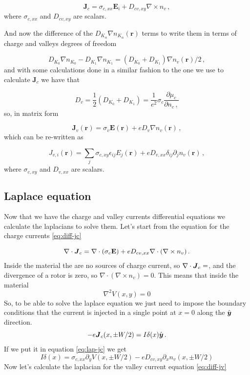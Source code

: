 \begin{equation}
    \mathbf J_{c}= \sigma_{c,xx}\mathbf E_i + D_{cv,xy} \nabla \times n_v\,,
    \label{eq:diff-jc}
\end{equation}
where $\sigma_{c,xx}$ and $D_{cv,xy}$ are scalars.

And now the difference of the $D_{K_\alpha}\nabla n_{K_\alpha}(\mathbf r)$ terms to write them in terms of charge and valleys degrees of freedom

\[D_{K_0}\nabla n_{K_0}-D_{K_1}\nabla n_{K_1}=(D_{K_0}+D_{K_1})\nabla n_v(\mathbf r)/2\,,\]
and with some calculations done in a similar fashion to the one we use to calculate $\mathbf J_c$ we have that

\[D_v=\frac12(D_{K_0}+D_{K_1})=\frac 1{e^2}\sigma_c\frac{\partial \mu_c}{\partial n_c\,,}\]
so, in matrix form


\begin{equation}
    \mathbf J_v(\mathbf r)=\sigma_v\mathbf E(\mathbf r)+eD_{v}\nabla n_v(\mathbf r) \,,   
\end{equation}
which can be re-written as


\begin{equation}
    J_{v,i}(\mathbf r)=\sum_j \sigma_{c,xy} \epsilon_{ij}  E_j(\mathbf r)+eD_{v,xx}\delta_{ij}\partial_j n_v(\mathbf r)
    \,,
    \label{eq:diff-jv}  
\end{equation}
where $\sigma_{c,xy}$ and $D_{v,xx}$ are scalars.


\subsection{Laplace equation}

Now that we have the charge and valley currents differential equations we calculate the laplacians to solve them. Let's start from the equation for the charge currents \ref{eq:diff-jc}

\begin{equation}
    \nabla \cdot \boldsymbol{J}_c=\nabla \cdot (\sigma_c \mathbf E)+ eD_{cv,xx}\nabla \cdot (\nabla\times n_v)\,.
    \label{eq:lap-jc}
\end{equation}
Inside the material the are no sources of charge current, so $\nabla \cdot \boldsymbol{J}_c=$, and the divergence of a rotor is zero, so $\nabla \cdot (\nabla\times n_v)=0$. This means that inside the material
\begin{equation}
    \boxed{
    \nabla^2 V(x,y)=0
    }
\end{equation}
So, to be able to solve the laplace equation we just need to impose the boundary conditions that the current is injected in a single point at $x=0$ along the $\hat{\boldsymbol{y}}$ direction. 
\[
    -e\boldsymbol{J}_c(x,\pm W/2)=I\delta(x)\hat{\boldsymbol{y}}\,.
\]
If we put it in equation \ref{eq:lap-jc} we get
\begin{equation}
    \boxed{
        I\delta(x)=\sigma_{c,xx}\partial_y V(x,\pm W/2)-eD_{cv,xy}\partial_x n_v(x,\pm W/2)
    }
\end{equation}
Now let's calculate the laplacian for the valley current equation \ref{eq:diff-jv}



